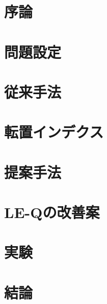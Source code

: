 \documentclass[platex, 12pt]{jreport}
\begin{document}


\chapter{序論}


\chapter{問題設定}


\chapter{従来手法}


\chapter{転置インデクス}


\chapter{提案手法}


\chapter{LE-Qの改善案}


\chapter{実験}


\chapter{結論}





%

%
\end{document}
